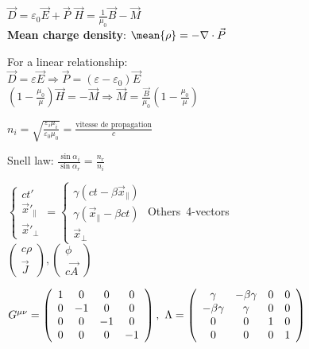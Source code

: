 $\vec{D}=\varepsilon_0\vec{E}+\vec{P}$ \hspace{0.05\textwidth}$\vec{H}=\frac{1}{\mu_0}\vec{B}-\vec{M}$\\
\textbf{Mean charge density}:
$\mean{\rho}=-\nabla\cdot \vec{P}$

For a linear relationship:\\
$\vec{D}=\varepsilon\vec{E}\Rightarrow\vec{P}=(\varepsilon-\varepsilon_0)\vec{E}$\\
$(1-\frac{\mu_0}{\mu})\vec{H}=-\vec{M}\Rightarrow\vec{M}=\frac{\vec{B}}{\mu_0}(1-\frac{\mu_0}{\mu})$


$n_i=\sqrt{\frac{\varepsilon_i\mu_i}{\varepsilon_0\mu_0}}=\frac{\text{vitesse de propagation}}{c}$

Snell law:
$\frac{\sin{\alpha_i}}{\sin{\alpha_r}}=\frac{n_r}{n_i}$



\begin{multicols}{2}
    
$\begin{cases}
ct'\\
\vec{x}'_{\parallel}\\
\vec{x}'_{\perp}
\end{cases}
=
\begin{cases}
\gamma(ct-\beta\vec{x}_\parallel)\\
\gamma(\vec{x}_\parallel-\beta c t)\\
\vec{x}_\perp
\end{cases}
$
Others~4-vectors\\

$\begin{pmatrix}
c\rho\\
\vec{J}
\end{pmatrix}, 
\begin{pmatrix}
\phi\\
c\vec{A}
\end{pmatrix}
$
\end{multicols}

$G^{\mu\nu}=
\begin{pmatrix}
\begin{array}{cccc}
1 & 0 & 0 & 0 \\ 
0 & -1 & 0 & 0 \\ 
0 & 0 & -1 & 0 \\ 
0 & 0 & 0 & -1
\end{array} 
\end{pmatrix}, \hspace{0.01\textwidth}
\Lambda=
\begin{pmatrix}
\begin{array}{cccc}
\gamma & -\beta \gamma & 0 & 0 \\ 
-\beta \gamma & \gamma & 0 & 0 \\ 
0 & 0 & 1 & 0 \\ 
0 & 0 & 0 & 1
\end{array} 
\end{pmatrix}
$

